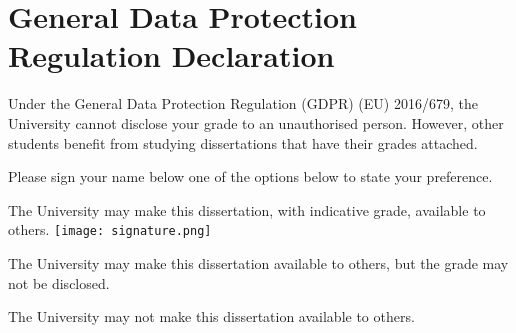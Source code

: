 \section*{General Data Protection Regulation Declaration}
\vspace{0.5cm}
\begin{flushleft}
Under the General Data Protection Regulation (GDPR) (EU) 2016/679, the University cannot disclose your grade to an unauthorised person. However, other students benefit from studying dissertations that have their grades attached.\newline
\vspace{0.5cm}

Please sign your name below one of the options below to state your preference.\newline
\vspace{0.5cm}

The University may make this dissertation, with indicative grade, available to others.\newline
\texttt{[image: signature.png]}
\vspace{2.5cm}

The University may make this dissertation available to others, but the grade may not be disclosed.\newline
\vspace{3cm}

The University may not make this dissertation available to others.\newline
\end{flushleft}
